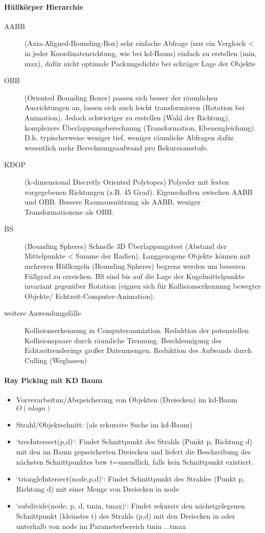 \documentclass[10pt,landscape]{article}
\begin{document}
\begin{multicols}{3}
\paragraph*{Hüllkörper Hierarchie}
\begin{description}
  \item[AABB] (Axia-Aligned-Bounding-Box) sehr einfache Abfrage (nur ein Vergleich < in jeder Koordinatenrichtung, wie bei kd-Baum) einfach zu erstellen (min, max), dafür nicht optimale Packungsdichte bei schräger Lage der Objekte
  \item[OBB] (Oriented Bounding Boxes) passen sich besser der räumlichen Ausrichtungen an, lassen sich auch leicht transformieren (Rotation bei Animation). Jedoch schwieriger zu erstellen (Wahl der Richtung), komplexere Überlappungsberechnung (Transformation, Ebenengleichung). D.h. typischerweise weniger tief, weniger räumliche Abfragen dafür wesentlich mehr Berechnungsaufwand pro Rekursionsstufe.
  \item[KDOP] (k-dimensional Discretly Oriented Polytopes) Polyeder mit festen vorgegebenen Richtungen (z.B. 45 Grad). Eigenschaften zwischen AABB und OBB. Bessere Raumausnützung als AABB, weniger Transformationene als OBB.
  \item[BS] (Bounding Spheres) Schnelle 3D Überlappungstest (Abstand der Mittelpunkte < Summe der Radien). Langgezogene Objekte können mit mehreren Hüllkugeln (Bounding Spheres) begrenz werden um besseren Füllgrad zu erreichen. BS sind bis auf die Lage der Kugelmittelpunkte invariant gegenüber Rotation (eignen sich für Kollisionserkennung bewegter Objekte/ Echtzeit-Computer-Animation).
  \item[weitere Anwendungsfälle] Kollisionserkennung in Computeranmiation. Reduktion der potenziellen Kollisionspaare durch räumliche Trennung. Beschleunigung des Echtzeitrenderings großer Datenmengen. Reduktion des Aufwands durch Culling (Weglassen)
\end{description}

\paragraph{Ray Picking mit KD Baum}
\begin{itemize}
  \item Vorverarbeitun/Abspeicherung von Objekten (Dreiecken) im kd-Baum$O(n log n)$
  \item Strahl/Objektschnitt: (als rekursive Suche im kd-Baum)
  \item `treeIntersect(p,d)`: Findet Schnittpunkt des Strahls (Punkt p, Richtung d) mit den im Baum gepseicherten Dreiecken und liefert die Beschreibung des nächsten Schnittpunktes bzw t=unendlich, falls kein Schnittpunkt existiert.
  \item `triangleIntersect(node,p,d)`: Findet Schnittpunkt des Strahles (Punkt p, Richtung d) mit einer Menge von Dreiecken in node
  \item `subdivide(node, p, d, tmin, tmax)`: Findet rekursiv den nächstgelegenen Schnittpunkt (kleinstes t) des Strahls (p,d) mit den Dreiecken in oder unterhalb von node im Parameterbereich tmin ...tmax
\end{itemize}


\end{multicols}
\end{document}

